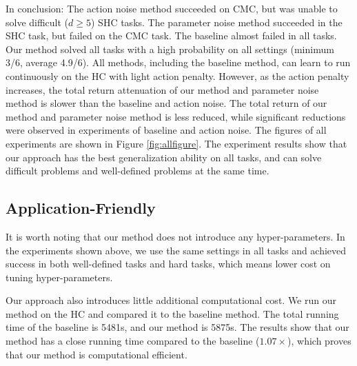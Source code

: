 In conclusion: The action noise method succeeded on CMC, but was unable to solve difficult ($d\ge5$) SHC tasks. The parameter noise method succeeded in the SHC task, but failed on the CMC task. The baseline almost failed in all tasks. Our method solved all tasks with a high probability on all settings (minimum 3/6, average 4.9/6). All methods, including the baseline method, can learn to run continuously on the HC with light action penalty. However, as the action penalty increases, the total return attenuation of our method and parameter noise method is slower than the baseline and action noise. The total return of our method and parameter noise method is less reduced, while significant reductions were observed in experiments of baseline and action noise. The figures of all experiments are shown in Figure \ref{fig:allfigure}. The experiment results show that our approach has the best generalization ability on all tasks, and can solve difficult problems and well-defined problems at the same time.

\subsection{Application-Friendly}
It is worth noting that our method does not introduce any hyper-parameters. In the experiments shown above, we use the same settings in all tasks and achieved success in both well-defined tasks and hard tasks, which means lower cost on tuning hyper-parameters.
   
 Our approach also introduces little additional computational cost. We run our method on the HC and compared it to the baseline method. The total running time of the baseline is 5481s, and our method is 5875s. The results show that our method has a close running time compared to the baseline ($1.07\times$), which proves that our method is computational efficient.
